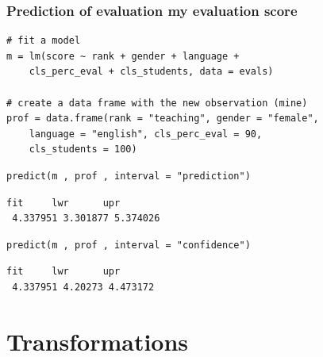\documentclass[slidestop,compress,mathserif,12pt,t,professionalfonts,xcolor=table]{beamer}
\begin{document}

\begin{frame}[fragile]
\frametitle{Prediction of evaluation my evaluation score}

\vspace{-0.2cm}

{\footnotesize
\begin{Verbatim}[frame=single, formatcom=\color{blue}]
# fit a model
m = lm(score ~ rank + gender + language + 
    cls_perc_eval + cls_students, data = evals)

# create a data frame with the new observation (mine)
prof = data.frame(rank = "teaching", gender = "female", 
    language = "english", cls_perc_eval = 90, 
    cls_students = 100)
\end{Verbatim}
}

\pause

{\footnotesize
\begin{Verbatim}[frame=single, formatcom=\color{blue}]
predict(m , prof , interval = "prediction")
\end{Verbatim}
}

\pause

{\footnotesize
\begin{Verbatim}[frame=single, formatcom=\color{gray}]
      fit     lwr      upr
 4.337951 3.301877 5.374026
\end{Verbatim}
}

\pause

{\footnotesize
\begin{Verbatim}[frame=single, formatcom=\color{blue}]
predict(m , prof , interval = "confidence")
\end{Verbatim}
}

\pause

{\footnotesize
\begin{Verbatim}[frame=single, formatcom=\color{gray}]
      fit     lwr      upr
 4.337951 4.20273 4.473172
\end{Verbatim}
}

\end{frame}


\section{Transformations}

\end{document}
